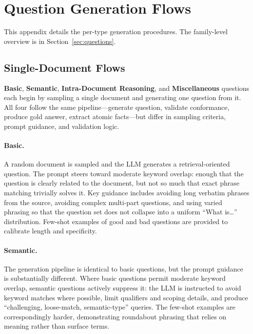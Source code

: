 \documentclass{article}
\begin{document}
\section{Question Generation Flows}
\label{app:questions}

This appendix details the per-type generation procedures. The family-level overview is in Section~\ref{sec:questions}.

\subsection{Single-Document Flows}
\label{app:single_doc}

\textbf{Basic}, \textbf{Semantic}, \textbf{Intra-Document Reasoning}, and \textbf{Miscellaneous} questions each begin by sampling a single document and generating one question from it. All four follow the same pipeline---generate question, validate conformance, produce gold answer, extract atomic facts---but differ in sampling criteria, prompt guidance, and validation logic.

\paragraph{Basic.}
A random document is sampled and the LLM generates a retrieval-oriented question. The prompt steers toward moderate keyword overlap: enough that the question is clearly related to the document, but not so much that exact phrase matching trivially solves it. Key guidance includes avoiding long verbatim phrases from the source, avoiding complex multi-part questions, and using varied phrasing so that the question set does not collapse into a uniform ``What is\ldots'' distribution. Few-shot examples of good and bad questions are provided to calibrate length and specificity.

\paragraph{Semantic.}
The generation pipeline is identical to basic questions, but the prompt guidance is substantially different. Where basic questions permit moderate keyword overlap, semantic questions actively suppress it: the LLM is instructed to avoid keyword matches where possible, limit qualifiers and scoping details, and produce ``challenging, loose-match, semantic-type'' queries. The few-shot examples are correspondingly harder, demonstrating roundabout phrasing that relies on meaning rather than surface terms.
\end{document}
